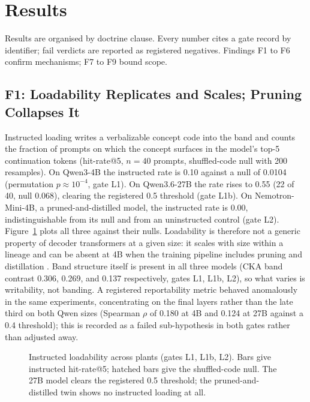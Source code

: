 \section{Results}
\label{sec:results}

Results are organised by doctrine clause. Every number cites a gate record by identifier; fail verdicts are reported as registered negatives. Findings F1 to F6 confirm mechanisms; F7 to F9 bound scope.

\subsection{F1: Loadability Replicates and Scales; Pruning Collapses It}
\label{sec:results:loadability}

Instructed loading writes a verbalizable concept code into the band and counts the fraction of prompts on which the concept surfaces in the model's top-5 continuation tokens (hit-rate@5, $n=40$ prompts, shuffled-code null with 200 resamples). On Qwen3-4B the instructed rate is 0.10 against a null of 0.0104 (permutation $p \approx 10^{-4}$, gate L1). On Qwen3.6-27B the rate rises to 0.55 (22 of 40, null 0.068), clearing the registered 0.5 threshold (gate L1b). On Nemotron-Mini-4B, a pruned-and-distilled model, the instructed rate is 0.00, indistinguishable from its null and from an uninstructed control (gate L2). Figure~\ref{fig:loadability} plots all three against their nulls. Loadability is therefore not a generic property of decoder transformers at a given size: it scales with size within a lineage and can be absent at 4B when the training pipeline includes pruning and distillation \cite{Minitron2024}. Band structure itself is present in all three models (CKA band contrast 0.306, 0.269, and 0.137 respectively, gates L1, L1b, L2), so what varies is writability, not banding. A registered reportability metric behaved anomalously in the same experiments, concentrating on the final layers rather than the late third on both Qwen sizes (Spearman $\rho$ of 0.180 at 4B and 0.124 at 27B against a 0.4 threshold); this is recorded as a failed sub-hypothesis in both gates rather than adjusted away.

\begin{figure}[t]
\centering
\resizebox{\columnwidth}{!}{}
\caption{Instructed loadability across plants (gates L1, L1b, L2). Bars give instructed hit-rate@5; hatched bars give the shuffled-code null. The 27B model clears the registered 0.5 threshold; the pruned-and-distilled twin shows no instructed loading at all.}
\label{fig:loadability}
\end{figure}

